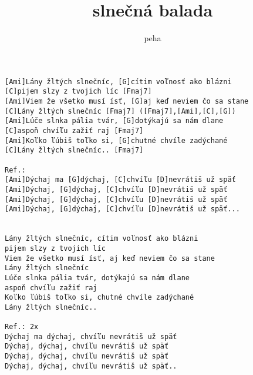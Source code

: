 \author{peha}
\title{slnečná balada}
\maketitle
\begin{verbatim}
[Ami]Lány žltých slnečníc, [G]cítim voľnosť ako blázni 
[C]pijem slzy z tvojich líc [Fmaj7] 
[Ami]Viem že všetko musí ísť, [G]aj keď neviem čo sa stane 
[C]Lány žltých slnečníc [Fmaj7] ([Fmaj7],[Ami],[C],[G])
[Ami]Lúče slnka pália tvár, [G]dotýkajú sa nám dlane 
[C]aspoň chvíľu zažiť raj [Fmaj7] 
[Ami]Koľko ľúbiš toľko si, [G]chutné chvíle zadýchané 
[C]Lány žltých slnečníc.. [Fmaj7] 

Ref.: 
[Ami]Dýchaj ma [G]dýchaj, [C]chvíľu [D]nevrátiš už späť 
[Ami]Dýchaj, [G]dýchaj, [C]chvíľu [D]nevrátiš už späť 
[Ami]Dýchaj, [G]dýchaj, [C]chvíľu [D]nevrátiš už späť 
[Ami]Dýchaj, [G]dýchaj, [C]chvíľu [D]nevrátiš už späť... 


Lány žltých slnečníc, cítim voľnosť ako blázni 
pijem slzy z tvojich líc 
Viem že všetko musí ísť, aj keď neviem čo sa stane 
Lány žltých slnečníc 
Lúče slnka pália tvár, dotýkajú sa nám dlane 
aspoň chvíľu zažiť raj 
Koľko ľúbiš toľko si, chutné chvíle zadýchané 
Lány žltých slnečníc.. 

Ref.: 2x 
Dýchaj ma dýchaj, chvíľu nevrátiš už späť 
Dýchaj, dýchaj, chvíľu nevrátiš už späť 
Dýchaj, dýchaj, chvíľu nevrátiš už späť 
Dýchaj, dýchaj, chvíľu nevrátiš už späť..
\end{verbatim}
